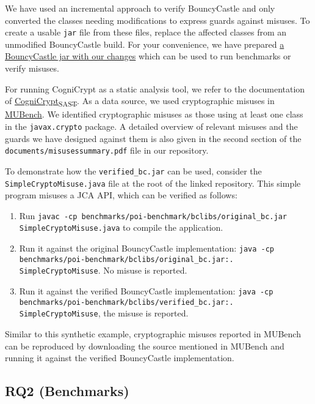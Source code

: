 \documentclass[parskip=full]{scrreprt}
\begin{document}
We have used an incremental approach to verify BouncyCastle and only converted the classes
needing modifications to express guards against misuses.
To create a usable \texttt{jar} file from these files, replace the affected classes from an
unmodified BouncyCastle build. For your convenience, we have prepared \href{https://zenodo.org/record/5767812/files/verified_bc.jar?download=1}{a BouncyCastle jar with our changes} which can be used to run benchmarks or verify misuses.

For running CogniCrypt as a static analysis tool, we refer to the documentation of \href{https://github.com/CROSSINGTUD/CryptoAnalysis}{CogniCrypt\textsubscript{SAST}}.
As a data source, we used cryptographic misuses in \href{https://github.com/stg-tud/MUBench}{MUBench}. We identified cryptographic misuses as those using at least one class in
the \texttt{javax.crypto} package.
A detailed overview of relevant misuses and the guards we have designed against them is also given in the second section of the \texttt{documents/misusessummary.pdf} file in our repository.

To demonstrate how the \texttt{verified\_bc.jar} can be used, consider the \texttt{SimpleCryptoMisuse.java} file at the root of the linked repository.
This simple program misuses a JCA API, which can be verified as follows:

\begin{enumerate}
 \item Run \texttt{javac -cp benchmarks/poi-benchmark/bclibs/original\_bc.jar  SimpleCryptoMisuse.java} to compile the application.
 \item Run it against the original BouncyCastle implementation: \texttt{java -cp benchmarks/poi-benchmark/bclibs/original\_bc.jar:. SimpleCryptoMisuse}. No misuse is reported.
 \item Run it against the verified BouncyCastle implementation: \texttt{java -cp benchmarks/poi-benchmark/bclibs/verified\_bc.jar:. SimpleCryptoMisuse}, the misuse is reported.
\end{enumerate}

Similar to this synthetic example, cryptographic misuses reported in MUBench can be reproduced by downloading the source mentioned in MUBench and running it against the verified BouncyCastle implementation.

\subsection{RQ2 (Benchmarks)}
\end{document}
